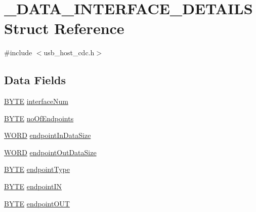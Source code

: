 \hypertarget{struct___d_a_t_a___i_n_t_e_r_f_a_c_e___d_e_t_a_i_l_s}{}\section{\+\_\+\+D\+A\+T\+A\+\_\+\+I\+N\+T\+E\+R\+F\+A\+C\+E\+\_\+\+D\+E\+T\+A\+I\+L\+S Struct Reference}
\label{struct___d_a_t_a___i_n_t_e_r_f_a_c_e___d_e_t_a_i_l_s}


{\ttfamily \#include $<$usb\+\_\+host\+\_\+cdc.\+h$>$}

\subsection*{Data Fields}
\begin{DoxyCompactItemize}
\item 
\hyperlink{_generic_type_defs_8h_a4ae1dab0fb4b072a66584546209e7d58}{B\+Y\+T\+E} \hyperlink{struct___d_a_t_a___i_n_t_e_r_f_a_c_e___d_e_t_a_i_l_s_a04971351adcb65ce1dd649d445c4c414}{interface\+Num}
\item 
\hyperlink{_generic_type_defs_8h_a4ae1dab0fb4b072a66584546209e7d58}{B\+Y\+T\+E} \hyperlink{struct___d_a_t_a___i_n_t_e_r_f_a_c_e___d_e_t_a_i_l_s_ae7efe3ea4a38a1939f37d7e220654771}{no\+Of\+Endpoints}
\item 
\hyperlink{_generic_type_defs_8h_a2b0e863dadf920709ec53d9088ee7c91}{W\+O\+R\+D} \hyperlink{struct___d_a_t_a___i_n_t_e_r_f_a_c_e___d_e_t_a_i_l_s_ab7ad72c61cd08e04d3cc7afa72bdb479}{endpoint\+In\+Data\+Size}
\item 
\hyperlink{_generic_type_defs_8h_a2b0e863dadf920709ec53d9088ee7c91}{W\+O\+R\+D} \hyperlink{struct___d_a_t_a___i_n_t_e_r_f_a_c_e___d_e_t_a_i_l_s_a1a13630966ba60004ab5c04a30a626b4}{endpoint\+Out\+Data\+Size}
\item 
\hyperlink{_generic_type_defs_8h_a4ae1dab0fb4b072a66584546209e7d58}{B\+Y\+T\+E} \hyperlink{struct___d_a_t_a___i_n_t_e_r_f_a_c_e___d_e_t_a_i_l_s_a60d9b8b97183d8ab3f3076df3bb7ace6}{endpoint\+Type}
\item 
\hyperlink{_generic_type_defs_8h_a4ae1dab0fb4b072a66584546209e7d58}{B\+Y\+T\+E} \hyperlink{struct___d_a_t_a___i_n_t_e_r_f_a_c_e___d_e_t_a_i_l_s_a7315b8753e0b037bc146e042802ebb68}{endpoint\+I\+N}
\item 
\hyperlink{_generic_type_defs_8h_a4ae1dab0fb4b072a66584546209e7d58}{B\+Y\+T\+E} \hyperlink{struct___d_a_t_a___i_n_t_e_r_f_a_c_e___d_e_t_a_i_l_s_af9c36438db4920f863a43c2662548c47}{endpoint\+O\+U\+T}
\end{DoxyCompactItemize}


